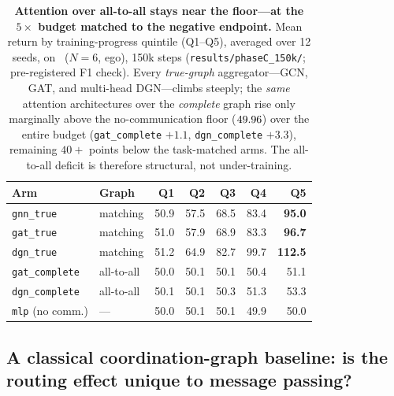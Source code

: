 \begin{table}[t]
  \centering
  \caption{\textbf{Attention over all-to-all stays near the floor---at the
  $5\times$ budget matched to the negative endpoint.} Mean return by
  training-progress quintile (Q1--Q5), averaged over 12 seeds, on
  \pairrouting\ ($N{=}6$, ego), 150k steps (\texttt{results/phaseC\_150k/};
  pre-registered F1 check). Every \emph{true-graph} aggregator---GCN, GAT, and
  multi-head DGN---climbs steeply; the \emph{same} attention architectures
  over the \emph{complete} graph rise only marginally above the no-communication
  floor ($49.96$) over the entire budget (\texttt{gat\_complete} $+1.1$,
  \texttt{dgn\_complete} $+3.3$), remaining $40+$ points below the task-matched
  arms. The all-to-all deficit is therefore structural, not under-training.}
  \label{tab:attn150k}
  \small
  \begin{tabular}{llrrrrr}
    \toprule
    Arm & Graph & Q1 & Q2 & Q3 & Q4 & Q5 \\
    \midrule
    \texttt{gnn\_true}      & matching   & 50.9 & 57.5 & 68.5 & 83.4 & \textbf{95.0} \\
    \texttt{gat\_true}      & matching   & 51.0 & 57.9 & 68.9 & 83.3 & \textbf{96.7} \\
    \texttt{dgn\_true}      & matching   & 51.2 & 64.9 & 82.7 & 99.7 & \textbf{112.5} \\
    \addlinespace
    \texttt{gat\_complete}  & all-to-all & 50.0 & 50.1 & 50.1 & 50.4 & 51.1 \\
    \texttt{dgn\_complete}  & all-to-all & 50.1 & 50.1 & 50.3 & 51.3 & 53.3 \\
    \texttt{mlp} (no comm.) & ---        & 50.0 & 50.1 & 50.1 & 49.9 & 50.0 \\
    \bottomrule
  \end{tabular}
\end{table}

\subsection{A classical coordination-graph baseline: is the routing effect unique to message passing?}
\label{sec:structure:classical}

